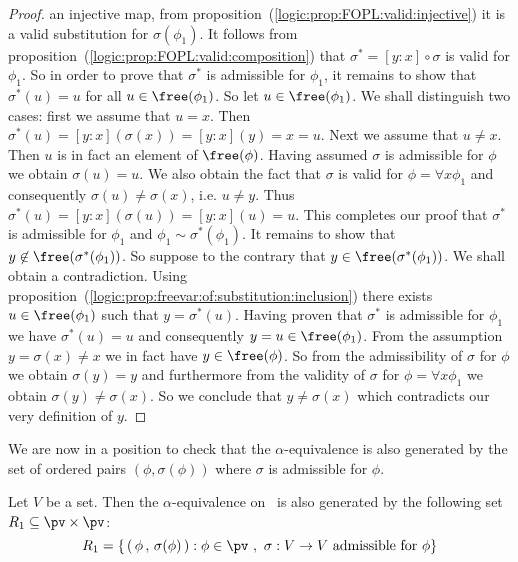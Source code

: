 \begin{proof}
an injective map, from
proposition~(\ref{logic:prop:FOPL:valid:injective}) it is a valid
substitution for $\sigma(\phi_{1})$. It follows from
proposition~(\ref{logic:prop:FOPL:valid:composition}) that
$\sigma^{*}=[y\!:\!x]\circ\sigma$ is valid for $\phi_{1}$. So in
order to prove that $\sigma^{*}$ is admissible for $\phi_{1}$, it
remains to show that $\sigma^{*}(u)=u$ for all
$u\in\free(\phi_{1})$. So let $u\in\free(\phi_{1})$. We shall
distinguish two cases: first we assume that $u=x$. Then
$\sigma^{*}(u)=[y\!:\!x](\sigma(x))=[y\!:\!x](y)=x=u$. Next we
assume that $u\neq x$. Then $u$ is in fact an element of
$\free(\phi)$. Having assumed $\sigma$ is admissible for $\phi$ we
obtain $\sigma(u)=u$. We also obtain the fact that $\sigma$ is valid
for $\phi=\forall x\phi_{1}$ and consequently
$\sigma(u)\neq\sigma(x)$, i.e. $u\neq y$. Thus
$\sigma^{*}(u)=[y\!:\!x](\sigma(u))=[y\!:\!x](u)=u$. This completes
our proof that $\sigma^{*}$ is admissible for $\phi_{1}$ and
$\phi_{1}\sim\sigma^{*}(\phi_{1})$. It remains to show that
$y\not\in\free(\sigma^{*}(\phi_{1}))$. So suppose to the contrary
that $y\in\free(\sigma^{*}(\phi_{1}))$. We shall obtain a
contradiction. Using
proposition~(\ref{logic:prop:freevar:of:substitution:inclusion})
there exists $u\in\free(\phi_{1})$ such that $y=\sigma^{*}(u)$.
Having proven that $\sigma^{*}$ is admissible for $\phi_{1}$ we have
$\sigma^{*}(u)=u$ and consequently $y=u\in\free(\phi_{1})$. From the
assumption $y=\sigma(x)\neq x$ we in fact have $y\in\free(\phi)$. So
from the admissibility of $\sigma$ for $\phi$ we obtain
$\sigma(y)=y$ and furthermore from the validity of $\sigma$ for
$\phi=\forall x\phi_{1}$ we obtain $\sigma(y)\neq\sigma(x)$. So we
conclude that $y\neq\sigma(x)$ which contradicts our very definition
of $y$.
\end{proof}

We are now in a position to check that the $\alpha$-equivalence  
is also generated by the set of ordered pairs $(\phi,\sigma(\phi))$
where $\sigma$ is admissible for $\phi$.

\begin{prop}\label{logic:prop:sub:congruence:from:admissible}
Let $V$ be a set. Then the $\alpha$-equivalence on \pv\ is also
generated by the following set $R_{1}\subseteq \pv\times\pv$:
    \[
    R_{1}=\left\{\,(\,\phi\,,\,\sigma(\phi)\,):\phi\in\pv\ ,\
    \mbox{$\sigma:V\to V$ admissible for $\phi$} \right\}
    \]
\end{prop}

